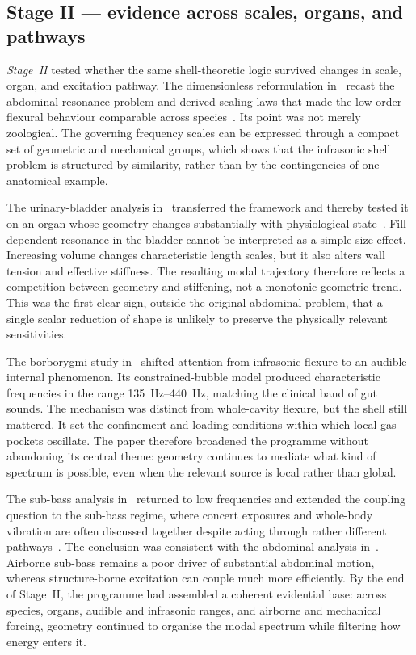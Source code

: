 \subsection{Stage II --- evidence across scales, organs, and pathways}

\emph{Stage~II} tested whether the same shell-theoretic logic survived changes in
scale, organ, and excitation pathway.  The dimensionless reformulation
in~\cite{BrowntoneP3} recast the abdominal resonance problem and derived scaling
laws that made the low-order
flexural behaviour comparable across species~\cite{BrowntoneP3}.  Its point was
not merely zoological.  The governing frequency scales can be
expressed through a compact set of geometric and mechanical groups, which shows
that the infrasonic shell problem is structured by similarity,
rather than by the contingencies of one anatomical example.

The urinary-bladder analysis in~\cite{BrowntoneP4} transferred the framework and thereby tested it
on an organ whose geometry changes substantially with physiological
state~\cite{BrowntoneP4}.  Fill-dependent resonance in the bladder
cannot be interpreted as a simple size effect.  Increasing volume
changes characteristic length scales, but it also alters wall tension and
effective stiffness.  The resulting modal trajectory therefore reflects a
competition between geometry and stiffening, not a monotonic geometric trend.
This was the first clear sign, outside the original abdominal problem, that a
single scalar reduction of shape is unlikely to preserve the physically
relevant sensitivities.

The borborygmi study in~\cite{BrowntoneP5} shifted attention from infrasonic
flexure to an audible internal phenomenon.  Its constrained-bubble model
produced characteristic frequencies in the range
\SIrange{135}{440}{\hertz}, matching the clinical band of gut sounds.  The
mechanism was distinct from whole-cavity flexure, but the shell still mattered.
It set the confinement and loading conditions within which local gas pockets
oscillate.  The paper therefore broadened the programme without abandoning its
central theme: geometry continues to mediate what kind of spectrum is possible,
even when the relevant source is local rather than global.

The sub-bass analysis in~\cite{BrowntoneP6} returned to low frequencies and
extended the coupling question to the sub-bass regime, where concert exposures
and whole-body vibration are often discussed together despite acting through
rather different pathways~\cite{BrowntoneP6}.  The conclusion was consistent
with the abdominal analysis in~\cite{BrowntoneP1}.  Airborne
sub-bass remains a poor driver of substantial abdominal motion, whereas
structure-borne excitation can couple much more efficiently.  By the end of
Stage~II, the programme had assembled a coherent evidential base: across species,
organs, audible and infrasonic ranges, and airborne and mechanical forcing,
geometry continued to organise the modal spectrum while filtering how energy
enters it.

